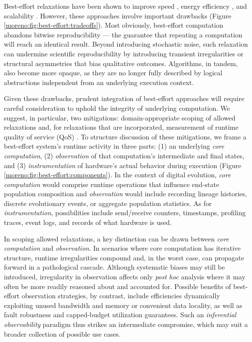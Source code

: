Best-effort relaxations have been shown to improve speed \cite{chakrapani2008probabilistic}, energy efficiency \cite{chakrapani2008probabilistic,bocquet2018memory}, and scalability \cite{meng2009best}.  %
However, these approaches involve important drawbacks (Figure \ref{moreno:fig:best-effort:tradeoffs}).
Most obviously, best-effort computation abandons bitwise reproducibility --- the guarantee that repeating a computation will reach an identical result.
Beyond introducing stochastic noise, such relaxation can undermine scientific reproducibility \cite{menon2025reproducibility} by introducing transient irregularities or structural asymmetries that bias qualitative outcomes.
Algorithms, in tandem, also become more opaque, as they are no longer fully described by logical abstractions independent from an underlying execution context.

Given these drawbacks, prudent integration of best-effort approaches will require careful consideration to uphold the integrity of underlying computation.
We suggest, in particular, two mitigations: domain-appropriate scoping of allowed relaxations and, for relaxations that are incorporated, measurement of runtime quality of service (QoS) \cite{karakus2017quality}.
To structure discussion of these mitigations, we frame a best-effort system's runtime activity in three parts: (1) an underlying \textit{core computation}, (2) \textit{observation} of that computation's intermediate and final states, and (3) \textit{instrumentation} of hardware's actual behavior during execution (Figure \ref{moreno:fig:best-effort:components}).
In the context of digital evolution, \textit{core computation} would comprise runtime operations that influence end-state population composition and \textit{observation} would include recording lineage histories, discrete evolutionary events, or aggregate population statistics.
As for \textit{instrumentation}, possibilities include send/receive counters, timestamps, profiling traces, event logs, and records of what hardware is used.

In scoping allowed relaxations, a key distinction can be drawn between \textit{core computation} and \textit{observation}.
In scenarios where core computation has iterative structure, runtime irregularities compound and, in the worst case, can propagate forward in a pathological cascade.
Although systematic biases may still be introduced, irregularity in observation affects only \textit{post hoc} analysis where it may often be more readily reasoned about and accounted for.
Possible benefits of best-effort observation strategies, by contrast, include efficiencies dynamically exploiting unused bandwidth and memory or convenient data locality, as well as fault robustness and capped-budget utilization guarantees.
Such an \textit{inferential observability} paradigm thus strikes an intermediate compromise, which may suit a broader collection of possible use cases.

